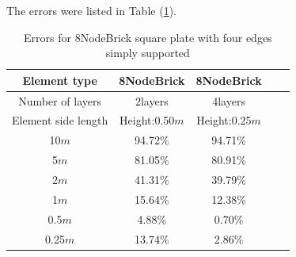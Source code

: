 \documentclass[fleqn,11pt,letter]{article}
\begin{document}
The errors were listed in Table (\ref{table Errors for 8NodeBrick square plate with four edges simply supported}).

\begin{table}[H]
  \centering
  \caption{Errors for 8NodeBrick square plate with four edges simply supported}
  \label{table Errors for 8NodeBrick square plate with four edges simply supported}
\begin{tabular}{|c|c|c|c|c|}
\hline
Element type        & 8NodeBrick     & 8NodeBrick      \\ \hline
Number of layers         & 2layers         & 4layers          \\ \hline
Element side length  & Height:0.50$m$ & Height:0.25$m$  \\ \hline
10$m$                & 94.72\% & 94.71\%        \\ \hline
5$m$                 & 81.05\% & 80.91\%        \\ \hline
2$m$                 & 41.31\% & 39.79\%        \\ \hline
1$m$                 & 15.64\% & 12.38\%        \\ \hline
0.5$m$               & 4.88\%  & 0.70\%         \\ \hline
0.25$m$              & 13.74\% & 2.86\%         \\
\hline
\end{tabular}
\end{table}

\end{document}
